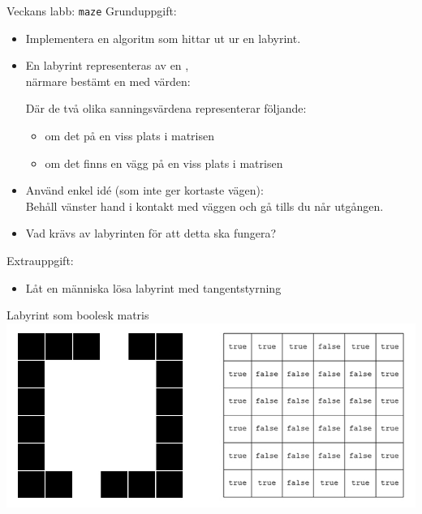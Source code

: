 

\begin{Slide}{Veckans labb: \texttt{maze}}\SlideFontSmall
Grunduppgift:
\begin{itemize}
\item Implementera en algoritm som hittar ut ur en labyrint.

\item En labyrint representeras av en , \\närmare bestämt en  med   värden: \\ 

\pause Där de två olika sanningsvärdena representerar följande:
\begin{itemize}\SlideFontSmall
\item {} om det  på en viss plats i matrisen
\item {} om det  finns en vägg på en viss plats i matrisen

\end{itemize}
\pause
\item Använd enkel idé (som inte ger kortaste vägen): \\ Behåll vänster hand i kontakt med väggen och gå tills du når utgången.

\item Vad krävs av labyrinten för att detta ska fungera?
\end{itemize}
\pause Extrauppgift:
\begin{itemize}
\item Låt en människa lösa labyrint med tangentstyrning
\end{itemize}

\end{Slide}

\begin{Slide}{Labyrint som boolesk matris}
\includegraphics[width=1.0\textwidth]{../img/w09-lab/MazeAndMatrix.jpg}
\end{Slide}

